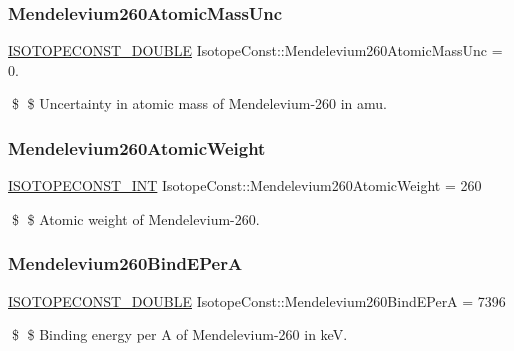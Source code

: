 \subsubsection{\texorpdfstring{Mendelevium260\+Atomic\+Mass\+Unc}{Mendelevium260AtomicMassUnc}}
{\footnotesize\ttfamily \mbox{\hyperlink{group___isotope_const-_macros_ga8f45a7272ce02c0b4c65c44636ed719a}{I\+S\+O\+T\+O\+P\+E\+C\+O\+N\+S\+T\+\_\+\+D\+O\+U\+B\+LE}} Isotope\+Const\+::\+Mendelevium260\+Atomic\+Mass\+Unc = 0.}

\$ \$ Uncertainty in atomic mass of Mendelevium-\/260 in amu. \mbox{\label{group___isotope_const-_mendelevium-_md260_ga2f1fe1daccf110d698fa46a424f41dcd}} 
\subsubsection{\texorpdfstring{Mendelevium260\+Atomic\+Weight}{Mendelevium260AtomicWeight}}
{\footnotesize\ttfamily \mbox{\hyperlink{group___isotope_const-_macros_ga5f18360b3e99483a35c32d789e62621c}{I\+S\+O\+T\+O\+P\+E\+C\+O\+N\+S\+T\+\_\+\+I\+NT}} Isotope\+Const\+::\+Mendelevium260\+Atomic\+Weight = 260}

\$ \$ Atomic weight of Mendelevium-\/260. \mbox{\label{group___isotope_const-_mendelevium-_md260_gab8f03990057312a1858f3bb632602a7c}} 
\subsubsection{\texorpdfstring{Mendelevium260\+Bind\+E\+PerA}{Mendelevium260BindEPerA}}
{\footnotesize\ttfamily \mbox{\hyperlink{group___isotope_const-_macros_ga8f45a7272ce02c0b4c65c44636ed719a}{I\+S\+O\+T\+O\+P\+E\+C\+O\+N\+S\+T\+\_\+\+D\+O\+U\+B\+LE}} Isotope\+Const\+::\+Mendelevium260\+Bind\+E\+PerA = 7396}

\$ \$ Binding energy per A of Mendelevium-\/260 in keV. \mbox{\label{group___isotope_const-_mendelevium-_md260_ga68cc5bb1ad1ab8f514272895c24f716b}} 
